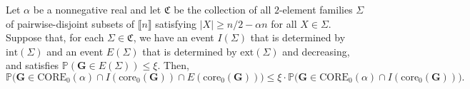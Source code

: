 \documentclass[11pt,a4paper,oneside,reqno]{amsart}
\newcommand{\bG}{\mathbf{G}}
\newcommand{\cS}{\mathcal{S}}
\newcommand{\fC}{\mathfrak{C}}
\renewcommand{\Pr}{\mathbb{P}}
\newcommand{\1}{\mathbbm{1}} %
\newcommand{\br}[1]{\llbracket{#1}\rrbracket}
\renewcommand{\le}{\leqslant}
\renewcommand{\ge}{\geqslant}
\newcommand{\ext}{\mathrm{ext}}
\renewcommand{\int}{\mathrm{int}}
\newcommand{\core}{\mathrm{core}}
\newcommand{\Core}{\mathrm{CORE}}
\begin{document}
\begin{lemma}
  \label{lemma:correlation-argument}
  Let $\alpha$ be a nonnegative real and let $\fC$ be the collection of all $2$-element families $\Sigma$ of pairwise-disjoint subsets of $\br{n}$ satisfying $|X| \ge n/2-\alpha n$ for all $X \in \Sigma$.
  Suppose that, for each $\Sigma \in \fC$, we have an event $I(\Sigma)$ that is determined by $\int(\Sigma)$ and an event $E(\Sigma)$ that is determined by $\ext(\Sigma)$ and decreasing, and satisfies $\Pr(\bG \in E(\Sigma)) \le \xi$.  Then,
  \[
    \Pr\big(\bG \in \Core_{0}(\alpha) \cap I(\core_0(\bG)) \cap E(\core_0(\bG))\big) \le \xi \cdot \Pr\big(\bG \in \Core_{0}(\alpha) \cap I(\core_0(\bG))\big).
  \]
\end{lemma}
\end{document}
